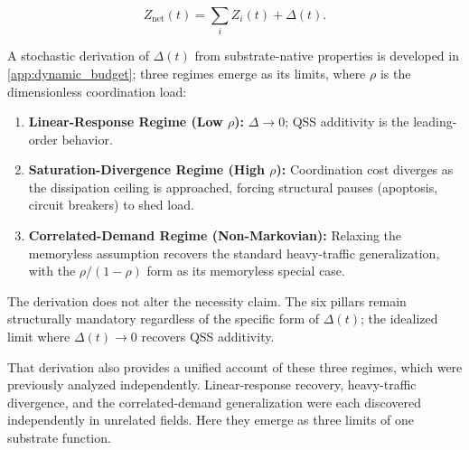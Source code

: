 \begin{equation}
    \label{eq:open_balance}
    Z_{\mathrm{net}}(t) = \sum_i Z_i(t) + \Delta(t).
\end{equation}

A stochastic derivation of $\Delta(t)$ from substrate-native properties is developed in \cref{app:dynamic_budget}; three regimes emerge as its limits, where $\rho$ is the dimensionless coordination load:
\begin{enumerate}
    \item \textbf{Linear-Response Regime (Low $\rho$):} $\Delta \to 0$; QSS additivity is the leading-order behavior.
    \item \textbf{Saturation-Divergence Regime (High $\rho$):} Coordination cost diverges as the dissipation ceiling is approached, forcing structural pauses (apoptosis, circuit breakers) to shed load.
    \item \textbf{Correlated-Demand Regime (Non-Markovian):} Relaxing the memoryless assumption recovers the standard heavy-traffic generalization, with the $\rho/(1-\rho)$ form as its memoryless special case.
\end{enumerate}
The derivation does not alter the necessity claim. The six pillars remain structurally mandatory regardless of the specific form of $\Delta(t)$; the idealized limit where $\Delta(t) \to 0$ recovers QSS additivity.

That derivation also provides a unified account of these three regimes, which were previously analyzed independently. Linear-response recovery, heavy-traffic divergence, and the correlated-demand generalization were each discovered independently in unrelated fields. Here they emerge as three limits of one substrate function.

